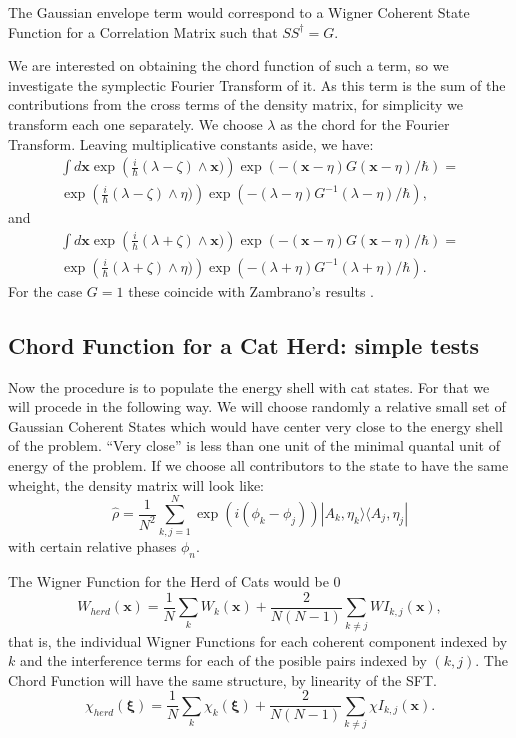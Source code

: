 \documentclass[a4paper,12pt]{article}
\newcommand{\ihb}{\frac{i}{\hbar}}
\newcommand{\xfase}{\mathbf{x}}
\newcommand{\xifase}{ {\boldsymbol{\xi}} }
\newcommand{\bra}[1]{\langle #1|}
\newcommand{\ket}[1]{|#1\rangle}
\begin{document}
The Gaussian envelope term would correspond to a Wigner Coherent State
Function for a Correlation Matrix such that $SS^\dagger=G$.

We are interested
on obtaining the chord function of such a term, so we investigate
the symplectic Fourier Transform of it.
As this term is the sum of the contributions from the cross terms
of the density matrix, for simplicity we transform each one separately.
We choose $\lambda$ as the chord for the Fourier Transform.
Leaving multiplicative constants aside, we have:
\begin{multline}
\int d \xfase \exp \left(\ihb (\lambda-\zeta)\wedge \xfase) \right)
\exp \left( -(\xfase-\eta)G (\xfase-\eta)/\hbar \right) =\\
\exp \left(\ihb (\lambda-\zeta)\wedge \eta) \right)
\exp \left( -(\lambda-\eta)G^{-1}(\lambda-\eta)/\hbar \right),
\end{multline}
and
\begin{multline}
\int d \xfase \exp \left(\ihb (\lambda+\zeta)\wedge \xfase) \right)
\exp \left( -(\xfase-\eta)G (\xfase-\eta)/\hbar \right) =\\
\exp \left(\ihb (\lambda+\zeta)\wedge \eta) \right)
\exp \left( -(\lambda+\eta)G^{-1}(\lambda+\eta)/\hbar \right).
\end{multline}
For the case $G=1$ these coincide with Zambrano's results 
\cite{tesiseduardo}.

\subsection{Chord Function for a Cat Herd: simple tests}

Now the procedure is to populate the energy shell with cat states. For that
we will procede in the following way. We will choose randomly a relative
small set of Gaussian Coherent States which would have center very
close to the energy shell of the problem. ``Very close'' is
less than  one unit of the minimal quantal unit of energy of the problem.
If we choose all contributors to the state to have the same wheight,
the density matrix will look like:
\begin{equation}
\hat{\rho}=\frac{1}{N^2}\sum_{k,j=1}^{N}
\exp(i(\phi_k-\phi_j))\ket{A_k,\eta_k}\bra{A_j, \eta_j}
\end{equation}
with certain relative phases $\phi_n$.

The Wigner Function for the Herd of Cats would be
0\begin{equation}
W_{herd}(\xfase)=\frac{1}{N}\sum_k W_k(\xfase)
+\frac{2}{N(N-1)}\sum_{k\neq j}WI_{k,j}(\xfase),
\end{equation}
that is, the individual Wigner Functions for each coherent
component indexed by $k$ and the interference terms for each of the
posible pairs indexed by $(k,j)$. The Chord Function will have
the same structure, by linearity of the SFT. 
\begin{equation}
\chi_{herd}(\xifase)=\frac{1}{N}\sum_k \chi_k(\xifase)
+\frac{2}{N(N-1)}\sum_{k\neq j}\chi I_{k,j}(\xfase).
\end{equation}
\end{document}

